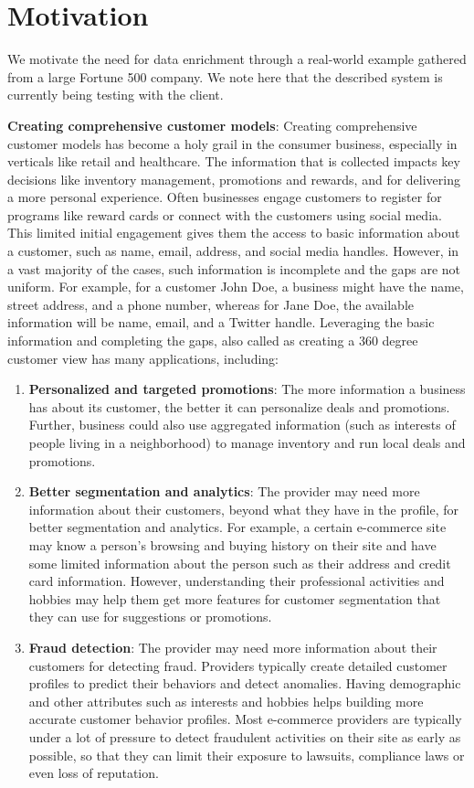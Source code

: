 \section{Motivation}
We motivate the need for data enrichment through a real-world example gathered from a large Fortune 500 company. We note here that the described system is currently being testing with the client. 

\textbf{Creating comprehensive customer models}:
		Creating comprehensive customer models has become a holy grail in the consumer business, especially in verticals like retail and healthcare. The information that is collected impacts key decisions
		like inventory management, promotions and rewards, and for delivering a more personal experience. Often businesses engage customers to register for programs like reward cards or connect with the 
		customers using social media. This limited initial engagement gives them the access to basic information about a customer, such as name, email, address, and social media handles. However, in  a vast 
		majority of the cases, such information is incomplete and the gaps are not uniform. For example, for a customer John Doe, a business might have the name, street address, and a phone number, whereas
		for Jane Doe, the available information will be name, email, and a Twitter handle. Leveraging the basic information and completing the gaps, also called as creating a 360 degree customer view has many 
		applications, including:  
		\begin{enumerate}
			\item \textbf{Personalized and targeted promotions}: The more information a business has about its customer, the better it can personalize deals and promotions. Further, business could also 
				use aggregated information (such as interests of people living in a neighborhood) to manage inventory and run local deals and promotions. 
			\item \textbf{Better segmentation and analytics}: The provider may need more information about their customers, beyond what they have in the profile, for better segmentation and analytics. 
				For example, a certain e-commerce site may know a person’s browsing and buying history on their site and have some limited information about the person such as their address and credit card 
				information. However, understanding their professional activities and hobbies may help them get more features for customer segmentation that they can use for suggestions or promotions.
				\item \textbf{Fraud detection}: The provider may need more information about their customers for detecting fraud. Providers typically create detailed customer profiles to predict their 
				behaviors and detect anomalies. Having demographic and other attributes such as interests and hobbies helps building more accurate customer behavior profiles. Most e-commerce providers 
				are typically under a lot of pressure to detect fraudulent activities on their site as early as possible, so that they can limit their exposure to lawsuits, compliance laws or even loss of 
				reputation.
		\end{enumerate}
